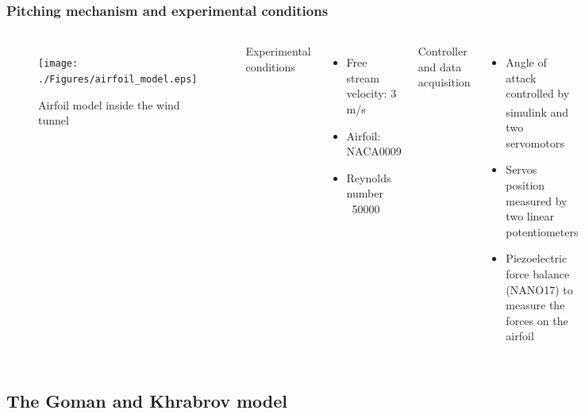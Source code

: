 \documentclass[compress]{beamer}
\begin{document}
\begin{frame}[shrink]
  \frametitle{Pitching mechanism and experimental conditions}
  \begin{columns}
    \begin{figure}[h]
      \begin{center}
	\texttt{[image: ./Figures/airfoil\_model.eps]}
      \end{center}
      \caption{Airfoil model inside the wind tunnel}
    \end{figure}
    Experimental conditions
    \begin{itemize}
      \item Free stream velocity: 3 m/s
      \item Airfoil: NACA0009
      \item Reynolds number ~50000
    \end{itemize}
    Controller and data acquisition
    \begin{itemize}
      \item Angle of attack controlled by simulink\textsuperscript{\textregistered} and two servomotors 
      \item Servos position measured by two linear potentiometers
      \item Piezoelectric force balance (NANO17) to measure the forces on the airfoil
    \end{itemize}
  \end{columns}
\end{frame}

\subsection{The Goman and Khrabrov model}
\end{document}
